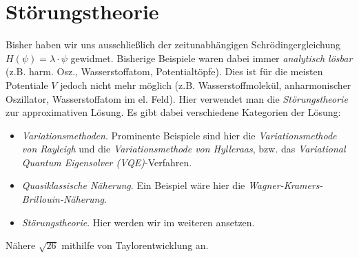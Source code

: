 \documentclass{subfiles}
\begin{document}
    \section{Störungstheorie}
        Bisher haben wir uns ausschließlich der zeitunabhängigen Schrödingergleichung $H(\psi) = \lambda\cdot\psi$ gewidmet. Bisherige Beispiele waren dabei immer \emph{analytisch lösbar} (z.B. harm. Osz., Wasserstoffatom, Potentialtöpfe). Dies ist für die meisten Potentiale $V$ jedoch nicht mehr möglich (z.B. Wasserstoffmolekül, anharmonischer Oszillator, Wasserstoffatom im el. Feld). Hier verwendet man die \emph{Störungstheorie} zur approximativen Lösung. Es gibt dabei verschiedene Kategorien der Lösung:
        \begin{itemize}[label=$\to$]
            \item \emph{Variationsmethoden}. Prominente Beispiele sind hier die \emph{Variationsmethode von Rayleigh} und die \emph{Variationsmethode von Hylleraas}, bzw. das \emph{Variational Quantum Eigensolver (VQE)}-Verfahren.
            \item \emph{Quasiklassische Näherung}. Ein Beispiel wäre hier die \textit{Wagner-Kramers-Brillouin-Näherung}.
            \item \emph{Störungstheorie}. Hier werden wir im weiteren ansetzen. 
        \end{itemize}
        \begin{Aufgabe}
            \nr{} Nähere $\sqrt{26}$ mithilfe von Taylorentwicklung an. 
        \end{Aufgabe}
\end{document}
